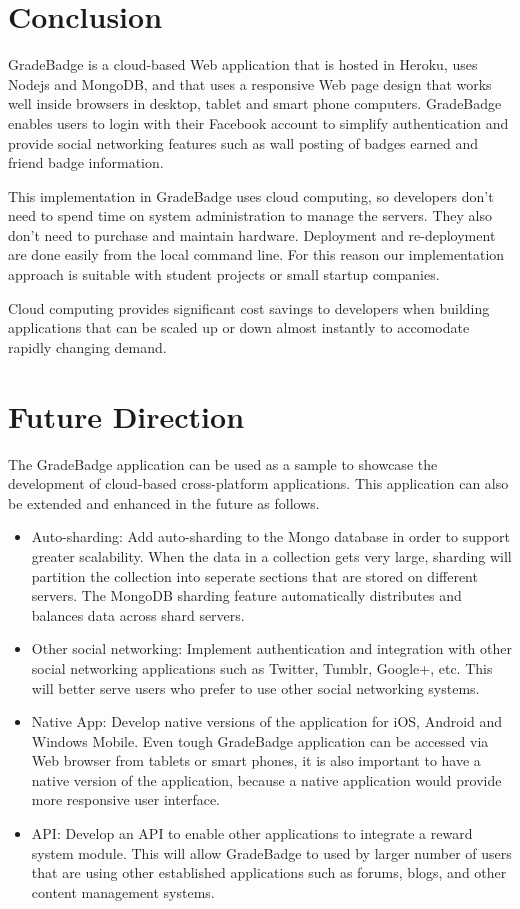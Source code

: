 
\section{Conclusion}

GradeBadge is a cloud-based Web application that is hosted in Heroku, uses Nodejs and MongoDB, and that uses a responsive Web page design that works well inside browsers in desktop, tablet and smart phone computers. GradeBadge enables users to login with their Facebook account to simplify authentication and provide social networking features such as wall posting of badges earned and friend badge information. 

This implementation in GradeBadge uses cloud computing, so developers don't need to spend time on system administration to manage the servers. They also don't need to purchase and maintain hardware. Deployment and re-deployment are done easily from the local command line. For this reason our implementation approach is suitable with student projects or small startup companies.

Cloud computing provides significant cost savings to developers when building applications that can be scaled up or down almost instantly to accomodate rapidly changing demand.

\section{Future Direction}

The GradeBadge application can be used as a sample to showcase the development of cloud-based cross-platform applications. This application can also be extended and enhanced in the future as follows. 

\begin{itemize}
\item Auto-sharding: Add auto-sharding to the Mongo database in order to support greater scalability. When the data in a collection gets very large, sharding will partition the collection into seperate sections that are stored on different servers. The MongoDB sharding feature automatically distributes and balances data across shard servers.  
\item Other social networking: Implement authentication and integration with other social networking applications such as Twitter, Tumblr, Google+,  etc. This will better serve users who prefer to use other social networking systems. 
\item Native App: Develop native versions of the application for iOS, Android and Windows Mobile. Even tough GradeBadge application can be accessed via Web browser from tablets or smart phones, it is also important to have a native version of the application, because a native application would provide more responsive user interface.   
\item API: Develop an API to enable other applications to integrate a reward system module. This will allow GradeBadge to used by larger number of users that are using other established applications such as forums, blogs, and other content management systems.
\end{itemize}
